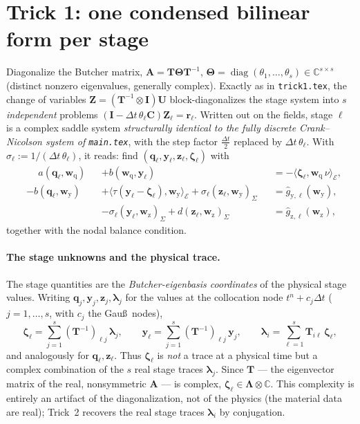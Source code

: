 \documentclass[11pt]{article}
\theoremstyle{remark}
\DeclareMathOperator*{\diag}{diag}
\renewcommand{\vec}{\boldsymbol}
\newcommand{\bvec}[1]{\vec{#1}}
\newcommand{\setEdge}{\mathcal E}        %
\newcommand{\vLambda}{\vec\Lambda}       %
\newcommand{\vldh}{\bvec\lambda}         %
\newcommand{\C}{\mathbb{C}}
\newcommand{\kron}{\otimes}
\newcommand{\mA}{\mathbf{A}}
\newcommand{\mT}{\mathbf{T}}
\newcommand{\mC}{\mathbf{C}}
\newcommand{\mI}{\mathbf{I}}
\newcommand{\mTh}{\boldsymbol{\Theta}}
\newcommand{\dt}{\Delta t}
\begin{document}
\section{Trick 1: one condensed bilinear form per stage}

Diagonalize the Butcher matrix, $\mA=\mT\mTh\mT^{-1}$,
$\mTh=\diag(\theta_1,\dots,\theta_s)\in\C^{s\times s}$ (distinct nonzero
eigenvalues, generally complex). Exactly as in \texttt{trick1.tex}, the change of
variables $\bvec Z=(\mT^{-1}\kron\mI)\bvec U$ block-diagonalizes the stage system
into $s$ \emph{independent} problems
$(\mI-\dt\,\theta_\ell\mC)\bvec Z_\ell=\bvec r_\ell$. Written out on the fields,
stage $\ell$ is a complex saddle system \emph{structurally identical to the fully
discrete Crank--Nicolson system of \texttt{main.tex}}, with the step factor
$\tfrac{\dt}{2}$ replaced by $\dt\,\theta_\ell$. With
$\sigma_\ell:=1/(\dt\,\theta_\ell)$, it reads: find
$(\bvec q_\ell,\bvec y_\ell,\bvec z_\ell,\vec\zeta_\ell)$ with
\begin{subequations}\label{eq:stage-saddle}
\begin{alignat}{3}
  &\phantom{{}-{}} a(\bvec q_\ell,\bvec w_{\mathrm q}) &&+ b(\bvec w_{\mathrm q},\bvec y_\ell)
    &&= -\langle \vec\zeta_\ell,\bvec w_{\mathrm q}\,\nu\rangle_\setEdge,\\
  &-b(\bvec q_\ell,\bvec w_{\mathrm y})
    &&+\langle\tau(\bvec y_\ell-\vec\zeta_\ell),\bvec w_{\mathrm y}\rangle_\setEdge
      +\sigma_\ell(\bvec z_\ell,\bvec w_{\mathrm y})_\Sigma
    &&= \widehat g_{\mathrm y,\ell}(\bvec w_{\mathrm y}),\\
  & &&-\sigma_\ell(\bvec y_\ell,\bvec w_{\mathrm z})_\Sigma
      +d(\bvec z_\ell,\bvec w_{\mathrm z})_\Sigma
    &&= \widehat g_{\mathrm z,\ell}(\bvec w_{\mathrm z}),
\end{alignat}
\end{subequations}
together with the nodal balance condition.

\paragraph{The stage unknowns and the physical trace.}
The stage quantities are the \emph{Butcher-eigenbasis coordinates} of the physical
stage values. Writing $\bvec q_j,\bvec y_j,\bvec z_j,\vldh_j$ for the values at the
collocation node $t^n+c_j\dt$ ($j=1,\dots,s$, with $c_j$ the Gau\ss\ nodes),
\begin{equation}\label{eq:zeta-lambda}
  \vec\zeta_\ell=\sum_{j=1}^s(\mT^{-1})_{\ell j}\,\vldh_j,\qquad
  \bvec y_\ell=\sum_{j=1}^s(\mT^{-1})_{\ell j}\,\bvec y_j,\qquad
  \vldh_i=\sum_{\ell=1}^s\mT_{i\ell}\,\vec\zeta_\ell,
\end{equation}
and analogously for $\bvec q_\ell,\bvec z_\ell$. Thus $\vec\zeta_\ell$ is \emph{not}
a trace at a physical time but a complex combination of the $s$ real stage traces
$\vldh_j$. Since $\mT$ --- the eigenvector matrix of the real, nonsymmetric $\mA$
--- is complex, $\vec\zeta_\ell\in\vLambda\kron\C$. This complexity is entirely an
artifact of the diagonalization, not of the physics (the material data are real);
Trick~2 recovers the real stage traces $\vldh_i$ by conjugation.
\end{document}
